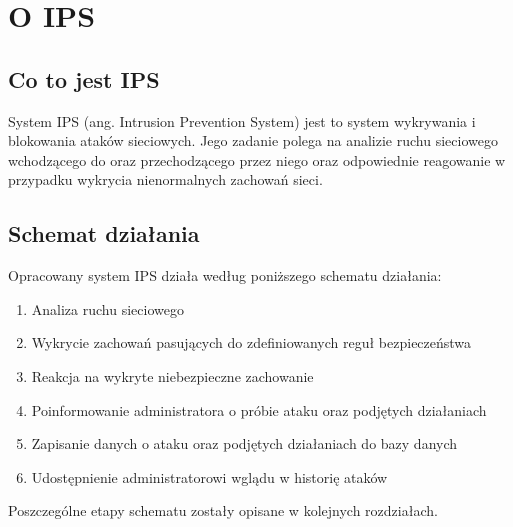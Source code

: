 \chapter{O IPS}
	\section{Co to jest IPS}
	System IPS (ang. Intrusion Prevention System) jest to system wykrywania i blokowania ataków sieciowych.
	Jego zadanie polega na analizie ruchu sieciowego wchodzącego do oraz przechodzącego przez niego oraz odpowiednie reagowanie w przypadku wykrycia nienormalnych zachowań sieci.
	\section{Schemat działania}
	Opracowany system IPS działa według poniższego schematu działania:
	\begin{enumerate}
		\item Analiza ruchu sieciowego
		\item Wykrycie zachowań pasujących do zdefiniowanych reguł bezpieczeństwa
		\item Reakcja na wykryte niebezpieczne zachowanie
		\item Poinformowanie administratora o próbie ataku oraz podjętych działaniach
		\item Zapisanie danych o ataku oraz podjętych działaniach do bazy danych
		\item Udostępnienie administratorowi wglądu w historię ataków
	\end{enumerate}
	Poszczególne etapy schematu zostały opisane w kolejnych rozdziałach.

